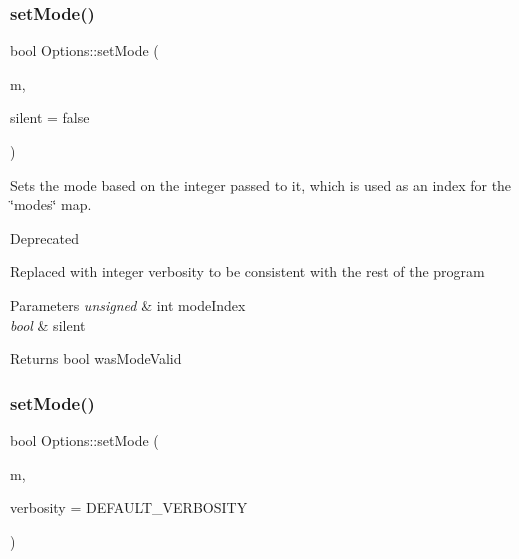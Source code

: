 \subsubsection{\texorpdfstring{setMode()}{setMode()}\hspace{0.1cm}{\footnotesize\ttfamily [1/6]}}
{\footnotesize\ttfamily bool Options\+::set\+Mode (\begin{DoxyParamCaption}\item[{unsigned int}]{m,  }\item[{bool}]{silent = {\ttfamily false} }\end{DoxyParamCaption})}



Sets the mode based on the integer passed to it, which is used as an index for the \char`\"{}modes\char`\"{} map. 

\begin{DoxyRefDesc}{Deprecated}
\item[\mbox{\hyperlink{deprecated__deprecated000003}{Deprecated}}]Replaced with integer verbosity to be consistent with the rest of the program\end{DoxyRefDesc}



\begin{DoxyParams}{Parameters}
{\em unsigned} & int mode\+Index \\
\hline
{\em bool} & silent\\
\hline
\end{DoxyParams}
\begin{DoxyReturn}{Returns}
bool was\+Mode\+Valid 
\end{DoxyReturn}
\mbox{\label{classOptions_a53f41c564dd16890a8704bfedcfe1cf3}} 
\subsubsection{\texorpdfstring{setMode()}{setMode()}\hspace{0.1cm}{\footnotesize\ttfamily [2/6]}}
{\footnotesize\ttfamily bool Options\+::set\+Mode (\begin{DoxyParamCaption}\item[{unsigned int}]{m,  }\item[{unsigned int}]{verbosity = {\ttfamily DEFAULT\+\_\+VERBOSITY} }\end{DoxyParamCaption})}



